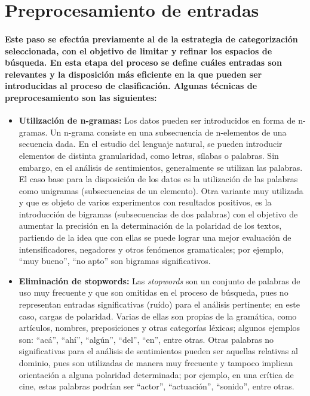 \section{Preprocesamiento de entradas}
\paragraph{Este paso se efect\'ua previamente al de la estrategia de categorizaci\'on seleccionada, con el objetivo de limitar y refinar los espacios de b\'usqueda. En esta etapa del proceso se define cu\'ales entradas son relevantes y la disposici\'on m\'as eficiente en la que pueden ser introducidas al proceso de clasificaci\'on. Algunas t\'ecnicas de preprocesamiento son las siguientes:}

\begin{itemize}

\item \textbf{Utilizaci\'on de n-gramas:} Los datos pueden ser introducidos en forma de n-gramas. Un n-grama consiste en una subsecuencia de n-elementos de una secuencia dada. En el estudio del lenguaje natural, se pueden introducir elementos de distinta granularidad, como letras, s\'ilabas o palabras. Sin embargo, en el an\'alisis de sentimientos, generalmente se utilizan las palabras. El caso base para la disposici\'on de los datos es la utilizaci\'on de las palabras como unigramas (subsecuencias de un elemento). Otra variante muy utilizada y que es objeto de varios experimentos con resultados positivos, es la introducci\'on de bigramas (subsecuencias de dos palabras) con el objetivo de aumentar la precisi\'on en la determinaci\'on de la polaridad de los textos, partiendo de la idea que con ellas se puede lograr una mejor evaluaci\'on de intensificadores, negadores y otros fen\'omenos gramaticales; por ejemplo, ``muy bueno'', ``no apto'' son bigramas significativos.

\item \textbf{Eliminaci\'on de stopwords:} Las \textit{stopwords} son un conjunto de palabras de uso muy frecuente y que son omitidas en el proceso de b\'usqueda, pues no representan entradas significativas (ru\'ido) para el an\'alisis pertinente; en este caso, cargas de polaridad. Varias de ellas son propias de la gram\'atica, como art\'iculos, nombres, preposiciones y otras categor\'ias l\'exicas; algunos ejemplos son: ``ac\'a'', ``ah\'i'', ``alg\'un'', ``del'', ``en'', entre otras. Otras palabras no significativas para el an\'alisis de sentimientos pueden ser aquellas relativas al dominio, pues son utilizadas de manera muy frecuente y tampoco implican orientaci\'on a alguna polaridad determinada; por ejemplo, en una cr\'itica de cine, estas palabras podr\'ian ser ``actor'', ``actuaci\'on'', ``sonido'', entre otras.


\end{itemize}
